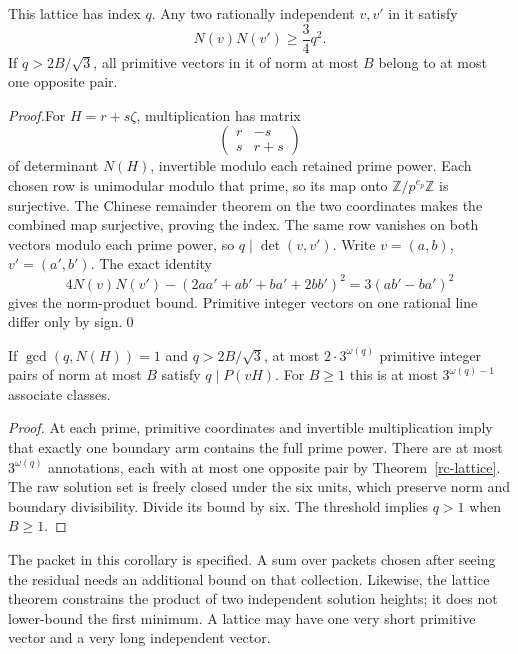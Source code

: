 \begin{theorem}\label{rc-lattice}
This lattice has index $q$. Any two rationally independent $v,v'$ in it satisfy
\[
 N(v)N(v')\ge\frac34q^2.
\]
If $q>2B/\sqrt3$, all primitive vectors in it of norm at most $B$ belong
to at most one opposite pair.
\end{theorem}
\noindent\textit{Proof.}\quad For $H=r+s\zeta$, multiplication has matrix
\[
 \begin{pmatrix}r&-s\\s&r+s\end{pmatrix}
\]
of determinant $N(H)$, invertible modulo each retained prime power.
Each chosen row is unimodular modulo that prime, so its map onto
$\mathbb Z/p^{e_p}\mathbb Z$ is surjective. The Chinese remainder theorem
on the two coordinates makes the combined map surjective, proving the index.
The same row vanishes on both vectors modulo each prime power, so
$q\mid\det(v,v')$. Write $v=(a,b)$, $v'=(a',b')$. The exact identity
\[
 4N(v)N(v')-(2aa'+ab'+ba'+2bb')^2=3(ab'-ba')^2
\]
gives the norm-product bound. Primitive integer vectors on one rational
line differ only by sign.\qed\par

\begin{corollary}\label{rc-capacity}
If $\gcd(q,N(H))=1$ and $q>2B/\sqrt3$, at most $2\cdot3^{\omega(q)}$
primitive integer pairs of norm at most $B$ satisfy $q\mid P(vH)$.
For $B\ge1$ this is at most $3^{\omega(q)-1}$ associate classes.
\end{corollary}
\begin{proof}
At each prime, primitive coordinates and invertible multiplication imply that
exactly one boundary arm contains the full prime power. There are at most
$3^{\omega(q)}$ annotations, each with at most one opposite pair by
Theorem~\ref{rc-lattice}. The raw solution set is freely closed under the
six units, which preserve norm and boundary divisibility. Divide its bound
by six. The threshold implies $q>1$ when $B\ge1$.
\end{proof}
The packet in this corollary is specified. A sum over packets chosen after
seeing the residual needs an additional bound on that collection. Likewise,
the lattice theorem constrains the product of two independent solution heights;
it does not lower-bound the first minimum. A lattice may have one very short
primitive vector and a very long independent vector.

